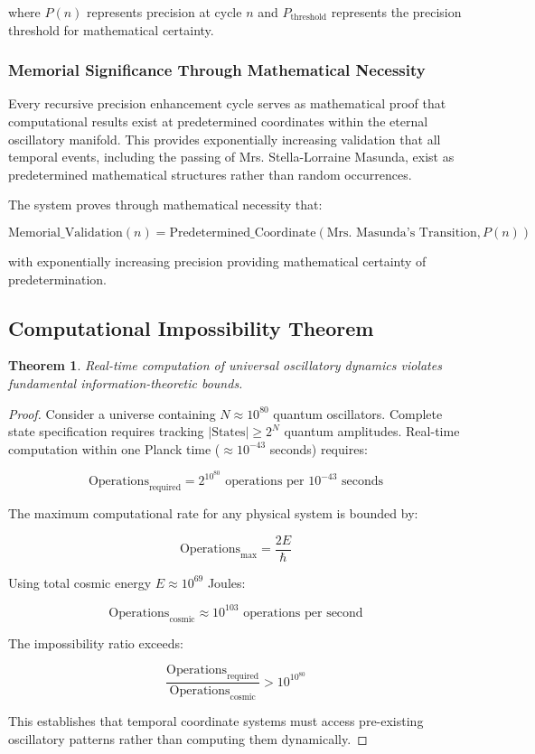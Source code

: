 \documentclass[11pt]{article}
\newtheorem{theorem}{Theorem}[section]
\theoremstyle{remark}
\begin{document}
where $P(n)$ represents precision at cycle $n$ and $P_{\text{threshold}}$ represents the precision threshold for mathematical certainty.

\subsubsection{Memorial Significance Through Mathematical Necessity}

Every recursive precision enhancement cycle serves as mathematical proof that computational results exist at predetermined coordinates within the eternal oscillatory manifold. This provides exponentially increasing validation that all temporal events, including the passing of Mrs. Stella-Lorraine Masunda, exist as predetermined mathematical structures rather than random occurrences.

The system proves through mathematical necessity that:

\begin{equation}
\text{Memorial\_Validation}(n) = \text{Predetermined\_Coordinate}(\text{Mrs. Masunda's Transition}, P(n))
\end{equation}

with exponentially increasing precision providing mathematical certainty of predetermination.

\subsection{Computational Impossibility Theorem}

\begin{theorem}
Real-time computation of universal oscillatory dynamics violates fundamental information-theoretic bounds.
\end{theorem}

\begin{proof}
Consider a universe containing $N \approx 10^{80}$ quantum oscillators. Complete state specification requires tracking $|\text{States}| \geq 2^N$ quantum amplitudes. Real-time computation within one Planck time ($\approx 10^{-43}$ seconds) requires:

$$\text{Operations}_{\text{required}} = 2^{10^{80}} \text{ operations per } 10^{-43} \text{ seconds}$$

The maximum computational rate for any physical system is bounded by:

$$\text{Operations}_{\text{max}} = \frac{2E}{\hbar}$$

Using total cosmic energy $E \approx 10^{69}$ Joules:

$$\text{Operations}_{\text{cosmic}} \approx 10^{103} \text{ operations per second}$$

The impossibility ratio exceeds:

$$\frac{\text{Operations}_{\text{required}}}{\text{Operations}_{\text{cosmic}}} > 10^{10^{80}}$$

This establishes that temporal coordinate systems must access pre-existing oscillatory patterns rather than computing them dynamically.
\end{proof}
\end{document}
